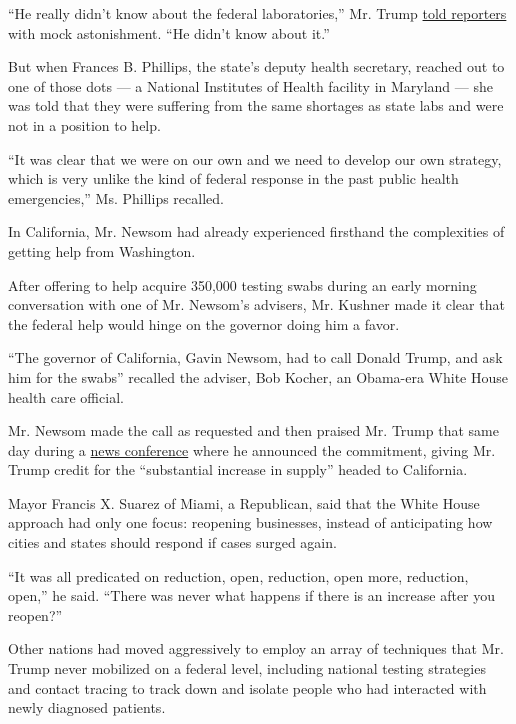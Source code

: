 ``He really didn't know about the federal laboratories,'' Mr. Trump
\href{https://www.whitehouse.gov/briefings-statements/remarks-president-trump-vice-president-pence-members-coronavirus-task-force-press-briefing-29/}{told
reporters} with mock astonishment. ``He didn't know about it.''

But when Frances B. Phillips, the state's deputy health secretary,
reached out to one of those dots --- a National Institutes of Health
facility in Maryland --- she was told that they were suffering from the
same shortages as state labs and were not in a position to help.

``It was clear that we were on our own and we need to develop our own
strategy, which is very unlike the kind of federal response in the past
public health emergencies,'' Ms. Phillips recalled.

In California, Mr. Newsom had already experienced firsthand the
complexities of getting help from Washington.

After offering to help acquire 350,000 testing swabs during an early
morning conversation with one of Mr. Newsom's advisers, Mr. Kushner made
it clear that the federal help would hinge on the governor doing him a
favor.

``The governor of California, Gavin Newsom, had to call Donald Trump,
and ask him for the swabs'' recalled the adviser, Bob Kocher, an
Obama-era White House health care official.

Mr. Newsom made the call as requested and then praised Mr. Trump that
same day during a
\href{https://www.facebookcorewwwi.onion/CAgovernor/videos/686605895491026/}{news
conference} where he announced the commitment, giving Mr. Trump credit
for the ``substantial increase in supply'' headed to California.

Mayor Francis X. Suarez of Miami, a Republican, said that the White
House approach had only one focus: reopening businesses, instead of
anticipating how cities and states should respond if cases surged again.

``It was all predicated on reduction, open, reduction, open more,
reduction, open,'' he said. ``There was never what happens if there is
an increase after you reopen?''

Other nations had moved aggressively to employ an array of techniques
that Mr. Trump never mobilized on a federal level, including national
testing strategies and contact tracing to track down and isolate people
who had interacted with newly diagnosed patients.


